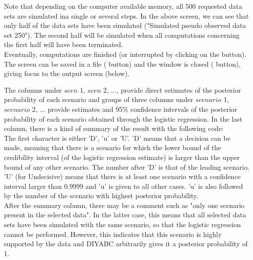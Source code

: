 {Note that depending on the computer available memory, all 500 requested data sets are simulated ina single or several steps. In the above screen, we can see that only half of the data sets have been simulated ("Simulated pseudo observed data set 250"). The second half will be simulated when all computations concerning the first half will have been terminated.\\

\newpage
Eventually, computations are finished (or interrupted by clicking on the  button). The screen can be saved in a file ( button) and the window is closed ( button), giving focus to the output screen (below).



The columns under $scen$ 1, $scen$ 2, ..., provide direct estimates of the posterior probability of each scenario and groups of three columns under $scenario$ 1, $scenario$ 2, ... provide estimates and 95\% confidence intervals of the posterior probability of each scenario obtained through the logistic regression. In the last column, there is a kind of summary of the result with the following code:\\
The first character is either 'D', 'u' or 'U'. 'D' means that a decision can be made, meaning that there is a scenario for which the lower bound of the credibility interval (of the logistic regression estimate) is larger than the upper bound of any other scenario. The number after 'D' is that of the leading scenario. 'U' (for Undecisive) means that there is at least one scenario with a confidence interval larger than 0.9999 and 'u' is given to all other cases. 'u' is also followed by the number of the scenario with highest posterior probability. \\

After the summary column, there may be a comment such as "only one scenario present in the selected data". In the latter case, this means that all selected data sets have been simulated with the same scenario, so that the logistic regression cannot be performed. However, this indicates that this scenario is highly supported by the data and DIYABC arbitrarily gives it a posterior probability of 1.

}
